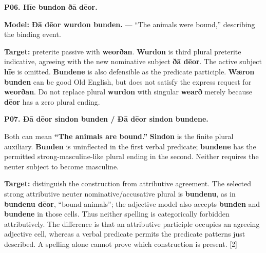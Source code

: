 \par\begin{minipage}{\linewidth}\raggedright
\textbf{P06. Hīe bundon ðā dēor.}

\textbf{Model:} \textbf{Ðā dēor wurdon bunden.} — “The animals were bound,” describing the binding event.

\textbf{Target:} preterite passive with \textbf{weorðan}. \textbf{Wurdon} is third plural preterite indicative, agreeing with the new nominative subject \textbf{ðā dēor}. The active subject \textbf{hīe} is omitted. \textbf{Bundene} is also defensible as the predicate participle. \textbf{Wǣron bunden} can be good Old English, but does not satisfy the express request for \textbf{weorðan}. Do not replace plural \textbf{wurdon} with singular \textbf{wearð} merely because \textbf{dēor} has a zero plural ending.

\end{minipage}\par\addvspace{4pt}

\par\begin{minipage}{\linewidth}\raggedright
\textbf{P07. Ðā dēor sindon bunden /\allowbreak{} Ðā dēor sindon bundene.}

Both can mean \textbf{“The animals are bound.”} \textbf{Sindon} is the finite plural auxiliary. \textbf{Bunden} is uninflected in the first verbal predicate; \textbf{bundene} has the permitted strong-masculine-like plural ending in the second. Neither requires the neuter subject to become masculine.

\textbf{Target:} distinguish the construction from attributive agreement. The selected strong attributive neuter nominative/\allowbreak{}accusative plural is \textbf{bundenu}, as in \textbf{bundenu dēor}, “bound animals”; the adjective model also accepts \textbf{bunden} and \textbf{bundene} in those cells. Thus neither spelling is categorically forbidden attributively. The difference is that an attributive participle occupies an agreeing adjective cell, whereas a verbal predicate permits the predicate patterns just described. A spelling alone cannot prove which construction is present. [2]

\end{minipage}\par\addvspace{4pt}

